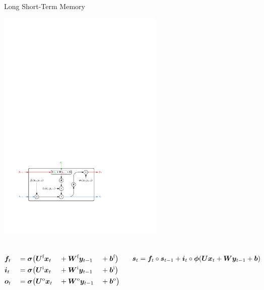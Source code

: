 \documentclass[11pt, xcolor={dvipsnames}, aspectratio=169, notes]{beamer}
\begin{document}

\begin{frame}{Long Short-Term Memory}
  \centering\footnotesize

  \includegraphics[width=0.6\textwidth]{ml/lstm}

  \begin{columns}
    \footnotesize

    \begin{alignat*}{4}
      &\bm{f}_{t} &&= \bm{\sigma}\bigl(\bm{U}^{\text{f}}  \bm{x}_{t} &&+ \bm{W}^{\text{f}}  \bm{y}_{t - 1} &&+ \bm{b}^{\text{f}}\bigr) \\
      &\bm{i}_{t} &&= \bm{\sigma}\bigl(\bm{U}^{\text{i}}  \bm{x}_{t} &&+ \bm{W}^{\text{i}}  \bm{y}_{t - 1} &&+ \bm{b}^{\text{i}}\bigr) \\
      &\bm{o}_{t} &&= \bm{\sigma}\bigl(\bm{U}^{\text{o}}  \bm{x}_{t} &&+ \bm{W}^{\text{o}}  \bm{y}_{t - 1} &&+ \bm{b}^{\text{o}}\bigr)
    \end{alignat*}

    \footnotesize

    \begin{align*}
      \bm{s}_{t} = \bm{f}_{t} \circ \bm{s}_{t - 1}
      + \bm{i}_{t} \circ \bm{\phi}(\bm{U} \bm{x}_{t} + \bm{W} \bm{y}_{t-1} + \bm{b})
    \end{align*}
  \end{columns}
\end{frame}
\end{document}
